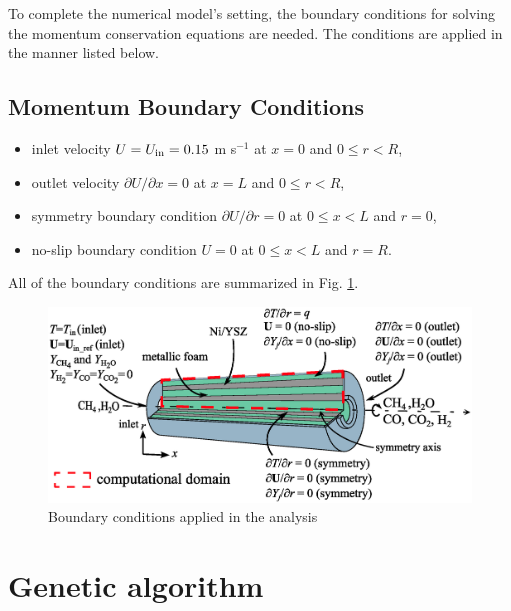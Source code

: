 \documentclass[preprint,12pt]{elsarticle}
\begin{document}
To complete the numerical model's setting, the boundary conditions for solving the momentum conservation equations are needed. The conditions are applied in the manner listed below. 

\subsection*{Momentum Boundary Conditions}
\begin{itemize}
  \item inlet velocity $U = U_{\rm{in}} = 0.15$ m s$^{-1}$ \hspace*{\fill} \hfill at $x = 0$ and $0 \leq r < R$,
  \item outlet velocity $\partial U / \partial x = 0$ \hspace*{\fill} \hfill at $x = L$ and $0 \leq r < R$,
  \item symmetry boundary condition $\partial U / \partial r = 0$ \hspace*{\fill} \hfill at $0 \leq x < L$ and $r = 0$,
  \item no-slip boundary condition $U = 0$ \hspace*{\fill} \hfill at $0 \leq x < L$ and $r = R$.
\end{itemize}

All of the boundary conditions are summarized in Fig. \ref{fig:boundary}.

\begin{figure}
\centering
\includegraphics[width=120mm]{boundary.eps}
\caption{\label{fig:boundary}Boundary conditions applied in the analysis} 
\end{figure}

\section{Genetic algorithm}
\label{sec:ga}
\end{document}
